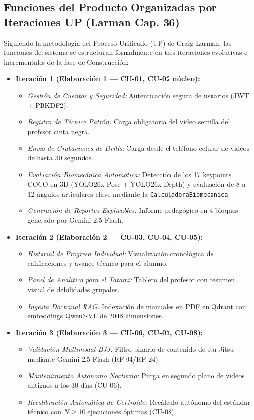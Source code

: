 \documentclass[12pt,letterpaper]{article}
\begin{document}
\subsection{Funciones del Producto Organizadas por Iteraciones UP (Larman Cap. 36)}
Siguiendo la metodología del Proceso Unificado (UP) de Craig Larman, las funciones del sistema se estructuran formalmente en tres iteraciones evolutivas e incrementales de la fase de Construcción:

\begin{itemize}
    \item \textbf{Iteración 1 (Elaboración 1 — CU-01, CU-02 núcleo):}
    \begin{itemize}
        \item \textit{Gestión de Cuentas y Seguridad:} Autenticación segura de usuarios (JWT + PBKDF2).
        \item \textit{Registro de Técnica Patrón:} Carga obligatoria del video semilla del profesor cinta negra.
        \item \textit{Envío de Grabaciones de Drills:} Carga desde el teléfono celular de videos de hasta 30 segundos.
        \item \textit{Evaluación Biomecánica Automática:} Detección de los 17 keypoints COCO en 3D (YOLO26x-Pose + YOLO26x-Depth) y evaluación de 8 a 12 ángulos articulares clave mediante la \texttt{CalculadoraBiomecanica}.
        \item \textit{Generación de Reportes Explicables:} Informe pedagógico en 4 bloques generado por Gemini 2.5 Flash.
    \end{itemize}

    \item \textbf{Iteración 2 (Elaboración 2 — CU-03, CU-04, CU-05):}
    \begin{itemize}
        \item \textit{Historial de Progreso Individual:} Visualización cronológica de calificaciones y avance técnico para el alumno.
        \item \textit{Panel de Analítica para el Tatami:} Tablero del profesor con resumen visual de debilidades grupales.
        \item \textit{Ingesta Doctrinal RAG:} Indexación de manuales en PDF en Qdrant con embeddings Qwen3-VL de 2048 dimensiones.
    \end{itemize}

    \item \textbf{Iteración 3 (Elaboración 3 — CU-06, CU-07, CU-08):}
    \begin{itemize}
        \item \textit{Validación Multimodal BJJ:} Filtro binario de contenido de Jiu-Jitsu mediante Gemini 2.5 Flash (RF-04/RF-24).
        \item \textit{Mantenimiento Autónomo Nocturno:} Purga en segundo plano de videos antiguos a los 30 días (CU-06).
        \item \textit{Recalibración Automática de Centroide:} Recálculo autónomo del estándar técnico con $N \ge 10$ ejecuciones óptimas (CU-08).
    \end{itemize}
\end{itemize}
\end{document}
